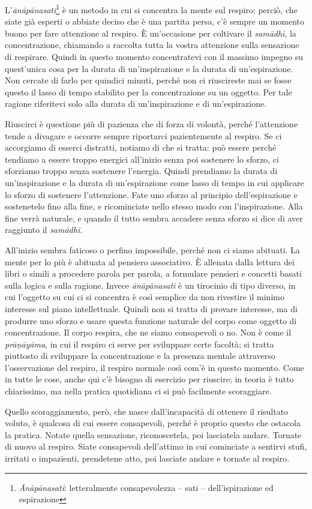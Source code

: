 
L'\textit{ānāpānasati}\footnote{\textit{Ānāpānasati}: letteralmente consapevolezza – sati –
dell'ispirazione ed espirazione} è un metodo in cui si concentra la mente sul
respiro; perciò, che siate già esperti o abbiate deciso che è una
partita persa, c'è sempre un momento buono per fare attenzione al
respiro. È un'occasione per coltivare il \textit{samādhi}, la concentrazione,
chiamando a raccolta tutta la vostra attenzione sulla sensazione di
respirare. Quindi in questo momento concentratevi con il massimo impegno
su quest'unica cosa per la durata di un'inspirazione e la durata di
un'espirazione. Non cercate di farlo per quindici minuti, perché non ci
riuscireste mai se fosse questo il lasso di tempo stabilito per la
concentrazione su un oggetto. Per tale ragione riferitevi solo alla
durata di un'inspirazione e di un'espirazione.

Riuscirci è questione più di pazienza che di forza di volontà, perché
l'attenzione tende a divagare e occorre sempre riportarci pazientemente
al respiro. Se ci accorgiamo di esserci distratti, notiamo di che si
tratta: può essere perché tendiamo a essere troppo energici all'inizio
senza poi sostenere lo sforzo, ci sforziamo troppo senza sostenere
l'energia. Quindi prendiamo la durata di un'inspirazione e la durata di
un'espirazione come lasso di tempo in cui applicare lo sforzo di
sostenere l'attenzione. Fate uno sforzo al principio dell'espirazione e
sostenetelo fino alla fine, e ricominciate nello stesso modo con
l'inspirazione. Alla fine verrà naturale, e quando il tutto sembra
accadere senza sforzo si dice di aver raggiunto il \textit{samādhi}.

All'inizio sembra faticoso o perfino impossibile, perché non ci siamo
abituati. La mente per lo più è abituata al pensiero associativo. È
allenata dalla lettura dei libri o simili a procedere parola per parola,
a formulare pensieri e concetti basati sulla logica e sulla ragione.
Invece \textit{ānāpānasati} è un tirocinio di tipo diverso, in cui l'oggetto su
cui ci si concentra è così semplice da non rivestire il minimo interesse
sul piano intellettuale. Quindi non si tratta di provare interesse, ma
di produrre uno sforzo e usare questa funzione naturale del corpo come
oggetto di concentrazione. Il corpo respira, che ne siamo consapevoli o
no. Non è come il \textit{prāṇāyāma}, in cui il respiro ci serve per sviluppare
certe facoltà; si tratta piuttosto di sviluppare la concentrazione e la
presenza mentale attraverso l'osservazione del respiro, il respiro
normale così com'è in questo momento. Come in tutte le cose, anche qui
c'è bisogno di esercizio per riuscire; in teoria è tutto chiarissimo, ma
nella pratica quotidiana ci si può facilmente scoraggiare.

Quello scoraggiamento, però, che nasce dall'incapacità di ottenere il
risultato voluto, è qualcosa di cui essere consapevoli, perché è proprio
questo che ostacola la pratica. Notate quella sensazione, riconoscetela,
poi lasciatela andare. Tornate di nuovo al respiro. Siate consapevoli
dell'attimo in cui cominciate a sentirvi stufi, irritati o impazienti,
prendetene atto, poi lasciate andare e tornate al respiro.

